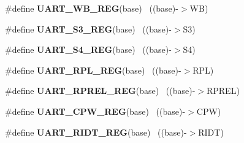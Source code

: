 \begin{DoxyCompactItemize}
\item 
\hypertarget{group___u_a_r_t___register___accessor___macros_ga611e232e99a27818b65df970b301d5b9}{}\#define {\bfseries U\+A\+R\+T\+\_\+\+W\+B\+\_\+\+R\+E\+G}(base)                                            ~((base)-\/$>$W\+B)\label{group___u_a_r_t___register___accessor___macros_ga611e232e99a27818b65df970b301d5b9}

\item 
\hypertarget{group___u_a_r_t___register___accessor___macros_gafc6f8edca21db84bf4d759858ea0e614}{}\#define {\bfseries U\+A\+R\+T\+\_\+\+S3\+\_\+\+R\+E\+G}(base)                                            ~((base)-\/$>$S3)\label{group___u_a_r_t___register___accessor___macros_gafc6f8edca21db84bf4d759858ea0e614}

\item 
\hypertarget{group___u_a_r_t___register___accessor___macros_gab1c6ea3ae57b45759a85f28f197d3353}{}\#define {\bfseries U\+A\+R\+T\+\_\+\+S4\+\_\+\+R\+E\+G}(base)                                            ~((base)-\/$>$S4)\label{group___u_a_r_t___register___accessor___macros_gab1c6ea3ae57b45759a85f28f197d3353}

\item 
\hypertarget{group___u_a_r_t___register___accessor___macros_ga695ae5db3f071a0ffdf2caac95e0170c}{}\#define {\bfseries U\+A\+R\+T\+\_\+\+R\+P\+L\+\_\+\+R\+E\+G}(base)                                          ~((base)-\/$>$R\+P\+L)\label{group___u_a_r_t___register___accessor___macros_ga695ae5db3f071a0ffdf2caac95e0170c}

\item 
\hypertarget{group___u_a_r_t___register___accessor___macros_gabae0b26a036c44298fab54ed63eedbad}{}\#define {\bfseries U\+A\+R\+T\+\_\+\+R\+P\+R\+E\+L\+\_\+\+R\+E\+G}(base)                                      ~((base)-\/$>$R\+P\+R\+E\+L)\label{group___u_a_r_t___register___accessor___macros_gabae0b26a036c44298fab54ed63eedbad}

\item 
\hypertarget{group___u_a_r_t___register___accessor___macros_ga8ad7859f9c963b10265b70c445a32258}{}\#define {\bfseries U\+A\+R\+T\+\_\+\+C\+P\+W\+\_\+\+R\+E\+G}(base)                                          ~((base)-\/$>$C\+P\+W)\label{group___u_a_r_t___register___accessor___macros_ga8ad7859f9c963b10265b70c445a32258}

\item 
\hypertarget{group___u_a_r_t___register___accessor___macros_ga422aa1d940710b00be831959b0c6f8c6}{}\#define {\bfseries U\+A\+R\+T\+\_\+\+R\+I\+D\+T\+\_\+\+R\+E\+G}(base)                                        ~((base)-\/$>$R\+I\+D\+T)\label{group___u_a_r_t___register___accessor___macros_ga422aa1d940710b00be831959b0c6f8c6}


\end{DoxyCompactItemize}
